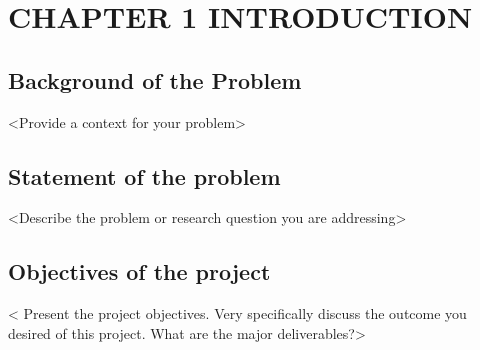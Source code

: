 \chapter[INTRODUCTION]{\hfill CHAPTER 1 \hfill\null\vskip15pt INTRODUCTION}

\section[\small BACKGROUND OF THE PROBLEM]{Background of the Problem}

{\textless}Provide a context for your problem{\textgreater}

\section[\small STATEMENT OF THE PROBLEM]{Statement of the problem}

{\textless}Describe the problem or research question you are addressing{\textgreater}

\section[\small OBJECTIVES OF THE PROJECT]{Objectives of the project}

{\textless} Present the project objectives.  Very specifically discuss the outcome you desired of this project.  What are the major deliverables?{\textgreater}